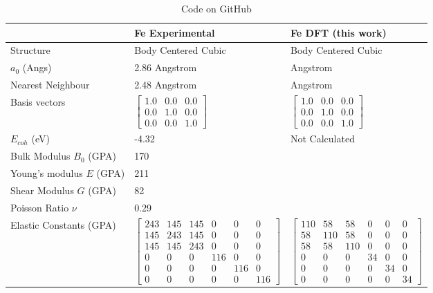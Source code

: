 \renewcommand{\arraystretch}{1.7}
\begin{table}[ht]
\begin{tabular}{lll}
\hline
& Fe Experimental & Fe DFT (this work)  \\
\hline
Structure                    & Body Centered Cubic & Body Centered Cubic  \\
$a_0$ (Angs)                 & 2.86 Angstrom &  Angstrom \\
Nearest Neighbour            & 2.48 Angstrom &  Angstrom \\
Basis vectors                & $\begin{bmatrix} 1.0 & 0.0 & 0.0 \\ 0.0 & 1.0 & 0.0 \\ 0.0 & 0.0 & 1.0 \end{bmatrix}$ & $\begin{bmatrix} 1.0 & 0.0 & 0.0 \\ 0.0 & 1.0 & 0.0 \\ 0.0 & 0.0 & 1.0 \end{bmatrix}$ \\
$E_{coh}$ (eV)               & -4.32 &  Not Calculated \\
Bulk Modulus $B_0$ (GPA)     & 170  &  \\
Young's modulus $E$ (GPA)    & 211  &  \\
Shear Modulus $G$ (GPA)      & 82  &  \\
Poisson Ratio $\nu$          & 0.29  &  \\
Elastic Constants (GPA)      & $\begin{bmatrix} 243 & 145 & 145 & 0 & 0 & 0 \\ 145 & 243 & 145 & 0 & 0 & 0 \\ 145 & 145 & 243 & 0 & 0 & 0 \\ 0 & 0 & 0 & 116 & 0 & 0 \\ 0 & 0 & 0 & 0 & 116 & 0 \\ 0 & 0 & 0 & 0 & 0 & 116 \end{bmatrix}$ & $\begin{bmatrix} 110 & 58 & 58 & 0 & 0 & 0 \\ 58 & 110 & 58 & 0 & 0 & 0 \\ 58 & 58 & 110 & 0 & 0 & 0 \\ 0 & 0 & 0 & 34 & 0 & 0 \\ 0 & 0 & 0 & 0 & 34 & 0 \\ 0 & 0 & 0 & 0 & 0 & 34 \end{bmatrix}$ \\
\end{tabular}
\label{tab:multicol}
\caption{Code on GitHub}
\end{table}




